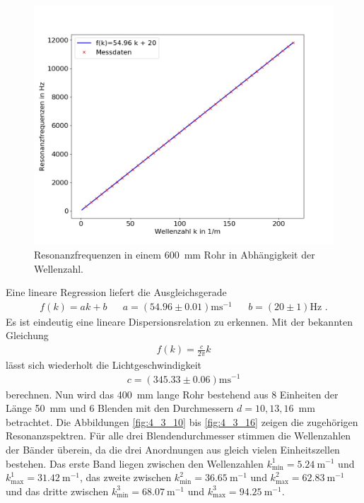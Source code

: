 \begin{figure}
\centering
\includegraphics[width=\textwidth]{content/messungen/Chapter4/plot_4_2.jpg}
\caption{Resonanzfrequenzen in einem 600~mm Rohr in Abhängigkeit der Wellenzahl.}
\label{fig:4_2_2}
\end{figure}
Eine lineare Regression liefert die Ausgleichsgerade
\begin{align*}
f(k)=ak+b &&a=(54.96\pm 0.01)\text{ms}^{-1}&&b=(20\pm 1)\text{Hz} \text{ .}
\end{align*}
Es ist eindeutig eine lineare Dispersionsrelation zu erkennen.
Mit der bekannten Gleichung
\begin{align*}
f(k)=\frac{c}{2\pi}k
\end{align*}
lässt sich wiederholt die Lichtgeschwindigkeit 
\begin{align*}
c=(345.33\pm0.06)\text{ms}^{-1}
\end{align*}
berechnen.
\FloatBarrier
Nun wird das 400~mm lange Rohr bestehend aus 8 Einheiten der Länge 50~mm und 6 Blenden mit den Durchmessern $d=10,13,16$~mm betrachtet.
Die Abbildungen \ref{fig:4_3_10} bis \ref{fig:4_3_16} zeigen die zugehörigen Resonanzspektren.
Für alle drei Blendendurchmesser stimmen die Wellenzahlen der Bänder überein, da die drei Anordnungen aus gleich vielen Einheitszellen bestehen.
Das erste Band liegen zwischen den Wellenzahlen $k^1_\text{min}=5.24~\text{m}^{-1}$ und $k^1_\text{max}=31.42~\text{m}^{-1}$, das zweite zwischen $k^2_\text{min}=36.65~\text{m}^{-1}$ und $k^2_\text{max}=62.83~\text{m}^{-1}$ und das dritte zwischen $k^3_\text{min}=68.07~\text{m}^{-1}$ und $k^3_\text{max}=94.25~\text{m}^{-1}$.
